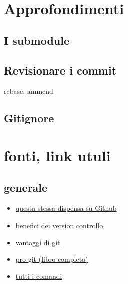 \documentclass{article} \usepackage[textwidth=19cm,textheight=24cm]{geometry}
\begin{document}
\section{Approfondimenti}

\subsection{I submodule}

\subsection{Revisionare i commit}

rebase, ammend

\subsection{Gitignore}

\section{fonti, link utuli}

\subsection{generale}
\begin{itemize}
    \item \href{https://github.com/Stivvo/GitNoob2Pro}
        {questa stessa dispensa su Github}
    \item \href{https://www.atlassian.com/git/tutorials/what-is-version-control}
        {benefici dei version controllo}
    \item \href{https://git-scm.com/about/branching-and-merging}
        {vantaggi di git}
    \item \href{https://git-scm.com/book/en/v2}
        {pro git (libro completo)}
    \item \href{https://git-scm.com/doc}
        {tutti i comandi}
\end{itemize}
\end{document}
